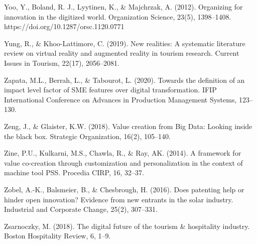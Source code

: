 \documentclass[
  letterpaper,
  DIV=11,
  numbers=noendperiod]{scrreprt}
\begin{document}
Yoo, Y., Boland, R. J., Lyytinen, K., \& Majchrzak, A. (2012).
Organizing for innovation in the digitized world. Organization Science,
23(5), 1398--1408. https://doi.org/10.1287/orsc.1120.0771

Yung, R., \& Khoo-Lattimore, C. (2019). New realities: A systematic
literature review on virtual reality and augmented reality in tourism
research. Current Issues in Tourism, 22(17), 2056--2081.

Zapata, M.L., Berrah, L., \& Tabourot, L. (2020). Towards the definition
of an impact level factor of SME features over digital transformation.
IFIP International Conference on Advances in Production Management
Systems, 123--130.

Zeng, J., \& Glaister, K.W. (2018). Value creation from Big Data:
Looking inside the black box. Strategic Organization, 16(2), 105--140.

Zine, P.U., Kulkarni, M.S., Chawla, R., \& Ray, AK. (2014). A framework
for value co-creation through customization and personalization in the
context of machine tool PSS. Procedia CIRP, 16, 32--37.

Zobel, A.-K., Balsmeier, B., \& Chesbrough, H. (2016). Does patenting
help or hinder open innovation? Evidence from new entrants in the solar
industry. Industrial and Corporate Change, 25(2), 307--331.

Zsarnoczky, M. (2018). The digital future of the tourism \& hospitality
industry. Boston Hospitality Review, 6, 1--9.
\end{document}
